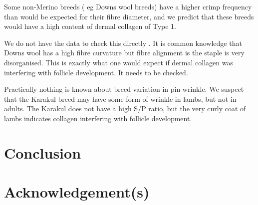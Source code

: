 \documentclass{article}
\begin{document}
Some non-Merino breeds ( eg Downs wool breeds) have a higher crimp frequency than would be expected for their fibre diameter, and we predict that these breeds  would have a high content of dermal collagen of Type 1.

We do not have the data to check this directly . It is common knowledge that Downs wool has a high fibre curvature but fibre alignment is the staple is very disorganised. This is exactly what one would expect if dermal collagen was interfering with follicle development. It needs to be checked.

Practically nothing is known about breed variation in pin-wrinkle.  We suspect that the Karakul breed may have some form of wrinkle in lambs, but not in adults.   The Karakul does not have a high S/P ratio, but the very curly coat of lambs indicates collagen interfering with follicle development.


\section{Conclusion}


\section*{Acknowledgement(s)}



\end{document}

